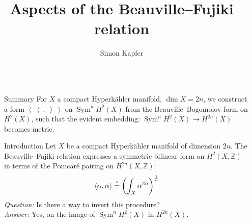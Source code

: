 \documentclass[final]{beamer}
\title{Aspects of the Beauville--Fujiki relation} %
\author{Simon Kapfer} %
\institute{Universit\'e de Poitiers} %
\newlength{\sepwid}
\newlength{\onecolwid}
\DeclareMathOperator{\Sym}{Sym}
\newcommand{\bra}{\left<\!\!\!\:\left<}
\newcommand{\ket}{\right>\!\!\!\:\right>}
\newcommand{\myeq}[1]{\mathrel{\overset{\makebox[0pt]{\text{\tiny #1}}}{=}}}
\newcommand{\stareq}{\myeq{*}}
\newcommand{\Z}{\mathbb{Z}}
\begin{document}

\setlength{\belowcaptionskip}{2ex} %
\setlength\belowdisplayshortskip{2ex} %

\begin{frame}[t] %

\begin{columns}[t] %

\begin{column}{\sepwid}\end{column} %

\begin{column}{\onecolwid} %

\begin{alertblock}{Summary}
For $X$ a compact Hyperk\"ahler manifold, $\dim X=2n$, we construct a form  $\bra\ ,\;\ket$ on $\Sym^nH^2(X)$ from the Beauville--Bogomolov form on $H^2(X)$, such that the
evident embedding: $\Sym^n\!H^2(X) \rightarrow H^{2n}(X)$ becomes metric.
\end{alertblock}




\begin{block}{Introduction}
Let $X$ be a compact Hyperk\"ahler manifold of dimension $2n$. The Beauville--Fujiki relation expresses a symmetric bilinear form on $H^2(X,\Z)$ in terms of the Poincar\'e pairing on $H^{2n}(X,\Z)$:
$$
\left< \alpha,\alpha\right> \stareq \left(\int_X \alpha^{2n} \right) ^{\frac{1}{n}} \vspace{6pt}
$$
\emph{Question:} Is there a way to invert this procedure? \vspace{6pt}\\
\emph{Answer:} Yes, on the image of $\Sym^n\!H^2(X)$ in $ H^{2n}(X)$.\vspace{6pt}


\end{block}
\end{column}
\end{columns}
\end{frame}
\end{document}
